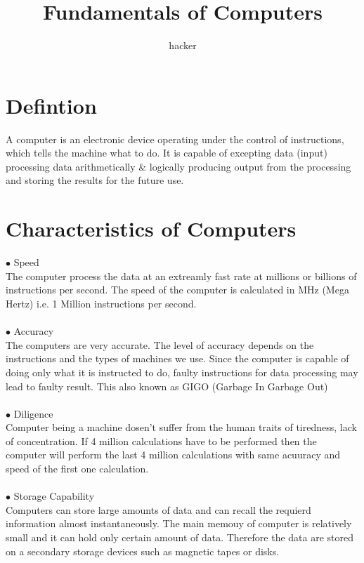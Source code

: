 \documentclass{article}
\date{}
\author{hacker}
\begin{document}
	\title{Fundamentals of Computers}
	\maketitle
	
	\newpage
	
	\section{Defintion}
	A computer is an electronic device operating under the control of instructions, which tells the machine what to do. It is capable of excepting data (input) processing data arithmetically \& logically producing output from the processing and storing the results for the future use.
	
	\section{Characteristics of Computers}
	$\bullet$ Speed \\
	The computer process the data at an extreamly fast rate at millions or billions of instructions per second. The speed of the computer is calculated in MHz (Mega Hertz) i.e. 1 Million instructions per second.	
	\\ \\
	$\bullet$ Accuracy \\
	The computers are very accurate. The level of accuracy depends on the instructions and the types of machines we use. Since the computer is capable of doing only what it is instructed to do, faulty instructions for data processing may lead to faulty result. This also known as GIGO (Garbage In Garbage Out)
	\\ \\
	$\bullet$ Diligence \\
	Computer being a machine dosen't suffer from the human traits of tiredness, lack of concentration. If 4 million calculations have to be performed then the computer will perform the last 4 million calculations with same acuuracy and speed of the first one calculation.
	\\ \\
	$\bullet$ Storage Capability \\
	Computers can store large amounts of data and can recall the requierd information almost instantaneously. The main memouy of computer is relatively small and it can hold only certain amount of data. Therefore the data are stored on a secondary storage devices such as magnetic tapes or disks.
\end{document}
